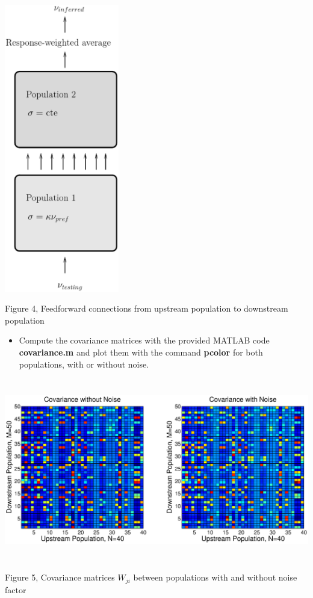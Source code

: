 \documentclass{article}
\begin{document}
\begin{center}
\includegraphics[width=50mm, height=90 mm]{schema2.eps}
\end{center}

\begin{center}
\begin{footnotesize}
 Figure 4, Feedforward connections from upstream population to downstream population
\end{footnotesize}
 \end{center}

\begin{itemize}
 \item Compute the covariance matrices with the provided MATLAB code \textbf{covariance.m} and plot them with the command \textbf{pcolor} for both populations, with or without noise.
\end{itemize}

\begin{center}
\includegraphics[width=\textwidth, height=80mm]{f3.eps}
\begin{footnotesize}
 Figure 5, Covariance matrices $W_{ji}$ between populations with and without noise factor
\end{footnotesize}
\end{center}
\end{document}
